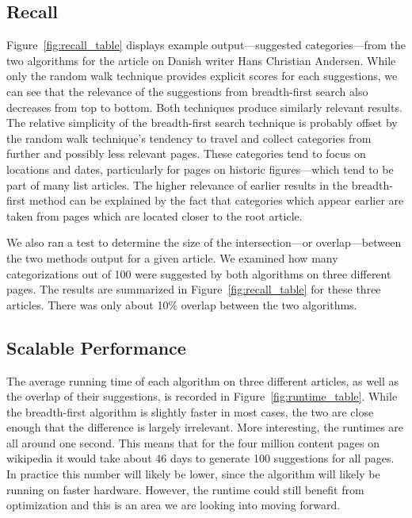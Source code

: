 \documentclass[]{sig-alternate}
\begin{document}
\subsection{Recall}
\label{subsec:recall}

Figure~\ref{fig:recall_table} displays example output---suggested categories---from the two algorithms for the article on Danish writer Hans Christian Andersen. While only the random walk technique provides explicit scores for each suggestions, we can see that the relevance of the suggestions from breadth-first search also decreases from top to bottom. Both techniques produce similarly relevant results. The relative simplicity of the breadth-first search technique is probably offset by the random walk technique's tendency to travel and collect categories from further and possibly less relevant pages. These categories tend to focus on locations and dates, particularly for pages on historic figures---which tend to be part of many list articles. The higher relevance of earlier results in the breadth-first method can be explained by the fact that categories which appear earlier are taken from pages which are located closer to the root article.

We also ran a test to determine the size of the intersection---or overlap---between the two methods output for a given article. We examined how many categorizations out of 100 were suggested by both algorithms on three different pages. The results are summarized in Figure~\ref{fig:recall_table} for these three articles. There was only about 10\% overlap between the two algorithms.

\subsection{Scalable Performance}
\label{subsec:scalable_performance}

The average running time of each algorithm on three different articles, as well as the overlap of their suggestions, is recorded in Figure~\ref{fig:runtime_table}. While the breadth-first algorithm is slightly faster in most cases, the two are close enough that the difference is largely irrelevant. More interesting, the runtimes are all around one second. This means that for the four million content pages on wikipedia it would take about 46 days to generate 100 suggestions for all pages. In practice this number will likely be lower, since the algorithm will likely be running on faster hardware. However, the runtime could still benefit from optimization and this is an area we are looking into moving forward.
\end{document}

